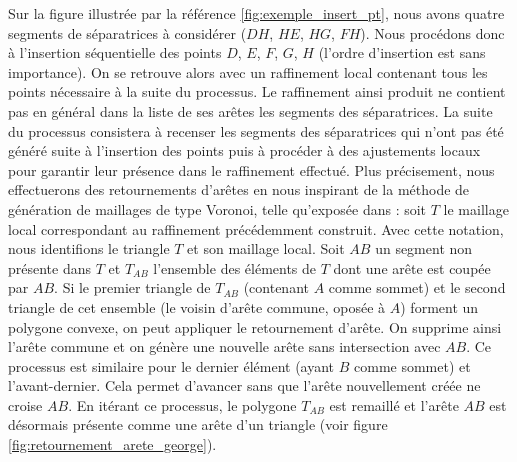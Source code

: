 Sur la figure illustrée par la référence \ref{fig:exemple_insert_pt}, nous avons quatre segments de séparatrices à considérer ($DH$, $HE$, $HG$, $FH$). Nous procédons donc à l'insertion séquentielle des points $D$, $E$, $F$, $G$, $H$ (l'ordre d'insertion est sans importance). On se retrouve alors avec un raffinement local contenant tous les points nécessaire à la suite du processus. Le raffinement ainsi produit ne contient pas en général dans la liste de ses arêtes les segments des séparatrices. La suite du processus consistera à recenser les segments des séparatrices qui n'ont pas été généré suite à l'insertion des points puis à procéder à des ajustements locaux pour garantir leur présence dans le raffinement effectué. Plus précisement, nous effectuerons des retournements d'arêtes en nous inspirant de la méthode de génération de maillages de type Voronoi, telle qu'exposée dans \cite{georgegeneration}: soit $T$ le maillage local correspondant au raffinement précédemment construit. Avec cette notation, nous identifions le triangle $T$ et son maillage local. Soit $AB$ un segment non présente dans $T$ et $T_{AB}$ l'ensemble des éléments de $T$ dont une arête est coupée par $AB$. Si le premier triangle de $T_{AB}$ (contenant $A$ comme sommet) et le second triangle de cet ensemble (le voisin d'arête commune, oposée à $A$) forment un polygone convexe, on peut appliquer le retournement d'arête. On supprime ainsi l'arête commune et on génère une nouvelle arête sans intersection avec $AB$. Ce processus est similaire pour le dernier élément (ayant $B$ comme sommet) et l'avant-dernier. Cela permet d'avancer sans que l'arête nouvellement créée ne croise $AB$. En itérant ce processus, le polygone $T_{AB}$ est remaillé et l'arête $AB$ est désormais présente comme une arête d'un triangle (voir figure \ref{fig:retournement_arete_george}).


